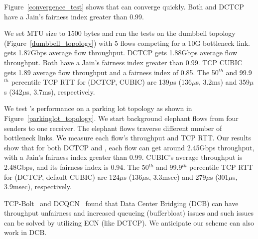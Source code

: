 Figure~\ref{convergence_test} shows that \acdc{} can converge quickly. Both \acdc{} and DCTCP
have a Jain's fairness index greater than 0.99.


We set MTU size to 1500 bytes and run the tests on the dumbbell topology (Figure~\ref{dumbbell_topology})
with 5 flows competing for
a 10G bottleneck link. \acdc{} gets 1.87Gbps average flow throughput. DCTCP gets 1.88Gbps average flow throughput. 
Both have a Jain's fairness index greater than 0.99. TCP CUBIC gets 1.89 average flow throughput and a fairness index of 0.85.
The 50$^{th}$ and 99.9$^{th}$ percentile TCP RTT for \acdc{} (DCTCP, CUBIC) are 139$\mu$s (136$\mu$s, 3.2ms) and
359$\mu$s (342$\mu$s, 3.7ms), respectively.

We test \acdc{}'s performance on a parking lot topology as shown in
Figure~\ref{parkinglot_topology}.
We start background elephant flows from
four senders to one receiver. The elephant flows traverse different number of
bottleneck links. We measure each flow's throughput and TCP RTT.
Our results show that for both DCTCP and \acdc{}, each flow can get around 2.45Gbps
throughput, with a Jain's fairness index greater than 0.99.
CUBIC's average throughput is 2.48Gbps, and its fairness index is 0.94.
The 50$^{th}$ and 99.9$^{th}$ percentile TCP RTT for
\acdc{} (DCTCP, default CUBIC) are 124$\mu$s (136$\mu$s, 3.3msec) and
279$\mu$s (301$\mu$s, 3.9msec), respectively.

TCP-Bolt~\cite{stephens2014practical} and DCQCN~\cite{zhu2015congestion} found
that Data Center Bridging (DCB) can have throughput unfairness and 
increased queueing (bufferbloat) issues and such issues can be solved by utilizing
ECN (like DCTCP). We anticipate our scheme can also work in DCB.

